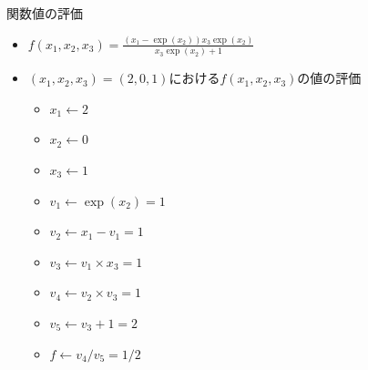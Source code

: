 \begin{frame}[t,fragile]{関数値の評価}
  \begin{itemize}
  \item $\displaystyle f(x_1,x_2,x_3) = \frac{(x_1 - \exp(x_2)) x_3 \exp(x_2)}{x_3 \exp(x_2) + 1}$
  \item $(x_1,x_2,x_3)=(2,0,1)$における$f(x_1,x_2,x_3)$の値の評価
    \begin{itemize}
    \item $x_1 \leftarrow 2$
    \item $x_2 \leftarrow 0$
    \item $x_3 \leftarrow 1$
    \item $v_1 \leftarrow \exp(x_2) = 1$
    \item $v_2 \leftarrow x_1 - v_1 = 1$
    \item $v_3 \leftarrow v_1 \times x_3 = 1$
    \item $v_4 \leftarrow v_2 \times v_3 = 1$
    \item $v_5 \leftarrow v_3 + 1 = 2$
    \item $f \leftarrow v_4 / v_5 = 1/2$
    \end{itemize}
    \vspace*{-7em} \hfill {}
  \end{itemize}
\end{frame}
